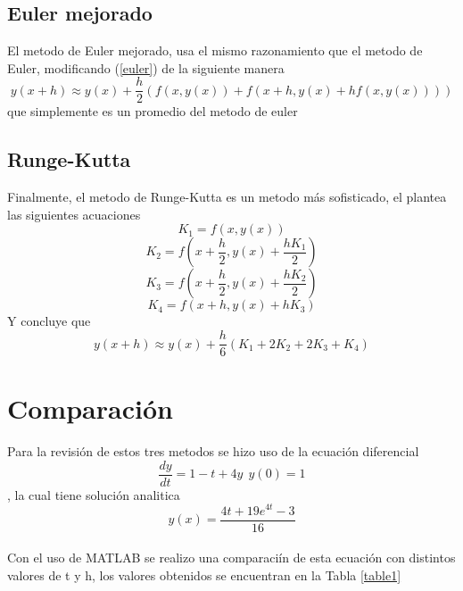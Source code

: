\documentclass[12pt]{article}
\begin{document}
\subsection{Euler mejorado}
El metodo de Euler mejorado, usa el mismo razonamiento que el metodo de Euler, modificando (\ref{euler}) de la siguiente manera
\begin{equation}
y(x+h) \approx y(x)+\frac{h}{2}(f(x,y(x))+f(x+h,y(x)+hf(x,y(x))))
\label{euler_m}
\end{equation}
que simplemente es un promedio del metodo de euler
\subsection{Runge-Kutta}
Finalmente, el metodo de Runge-Kutta es un metodo más sofisticado, el plantea las siguientes acuaciones $$K_{1} = f(x,y(x))$$$$K_{2} = f(x+\frac{h}{2},y(x)+\frac{hK_{1}}{2})$$$$K_3= f(x+\frac{h}{2}, y(x)+\frac{hK_{2}}{2})$$$$K_{4} = f(x+h, y(x)+hK_{3})$$
Y concluye que 
\begin{equation}
y(x+h) \approx y(x)+\frac{h}{6}(K_{1}+2K_{2}+2K_{3}+K_{4})
\label{runge_kutta}
\end{equation}

\section{Comparación}
Para la revisión de estos tres metodos se hizo uso de la ecuación diferencial
\begin{equation}
\frac{dy}{dt} = 1-t+4y~~y(0) = 1
\label{problema1}
\end{equation}, la cual tiene solución analitica $$y(x) = \frac{4t+19e^{4t} -3}{16}$$\\
Con el uso de MATLAB se realizo una comparaciín de esta ecuación con distintos valores de t y h, los valores obtenidos se encuentran en la Tabla \ref{table1}
\end{document}
